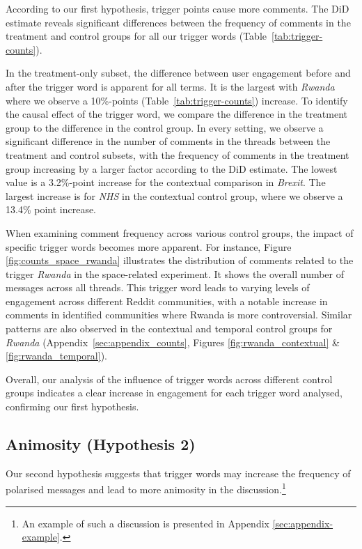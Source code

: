 According to our first hypothesis, trigger points cause more comments. The DiD estimate reveals significant differences between the frequency of comments in the treatment and control groups for all our trigger words (Table~\ref{tab:trigger-counts}).  

In the treatment-only subset, the difference between user engagement before and after the trigger word is apparent for all terms. It is the largest with \textit{Rwanda} where we observe a 10\%-points (Table~\ref{tab:trigger-counts}) increase. To identify the causal effect of the trigger word, we compare the difference in the treatment group to the difference in the control group. In every setting, we observe a significant difference in the number of comments in the threads between the treatment and control subsets, with the frequency of comments in the treatment group increasing by a larger factor according to the DiD estimate. The lowest value is a 3.2\%-point increase for the contextual comparison in \textit{Brexit}. The largest increase is for \textit{NHS} in the contextual control group, where we observe a 13.4\% point increase.


When examining comment frequency across various control groups, the impact of specific trigger words becomes more apparent. For instance, Figure \ref{fig:counts_space_rwanda} illustrates the distribution of comments related to the trigger \textit{Rwanda} in the space-related experiment. It shows the overall number of messages across all threads. This trigger word leads to varying levels of engagement across different Reddit communities, with a notable increase in comments in identified communities where Rwanda is more controversial. Similar patterns are also observed in the contextual and temporal control groups for \textit{Rwanda} (Appendix~\ref{sec:appendix_counts}, Figures \ref{fig:rwanda_contextual} \& \ref{fig:rwanda_temporal}).

Overall, our analysis of the influence of trigger words across different control groups indicates a clear increase in engagement for each trigger word analysed, confirming our first hypothesis.





\subsection{Animosity (Hypothesis 2)}
Our second hypothesis suggests that trigger words may increase the frequency of polarised messages and lead to more animosity in the discussion.\footnote{An example of such a discussion is presented in Appendix \ref{sec:appendix-example}.}

